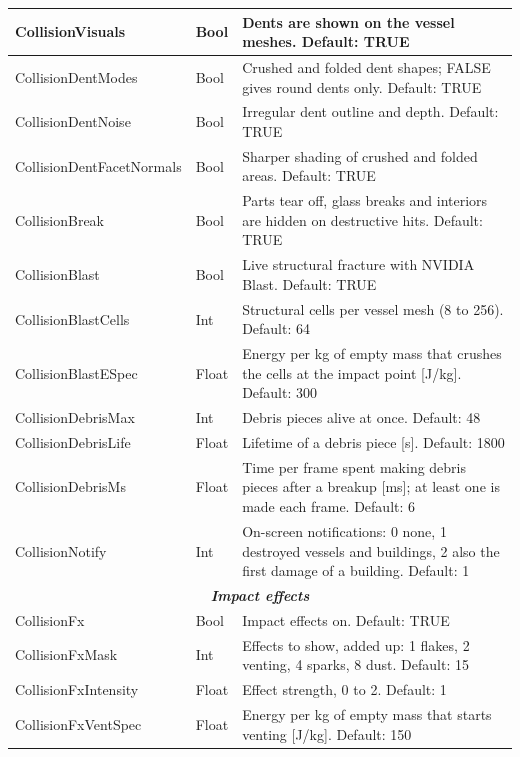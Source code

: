 \documentclass[Orbiter User Manual.tex]{subfiles}
\begin{document}
\begin{longtable}{ |p{}|p{}|p{}| }
	\hline\rule{0pt}{2ex}
	CollisionVisuals & Bool & Dents are shown on the vessel meshes. Default: TRUE\\
	\hline\rule{0pt}{2ex}
	CollisionDentModes & Bool & Crushed and folded dent shapes; FALSE gives round dents only. Default: TRUE\\
	\hline\rule{0pt}{2ex}
	CollisionDentNoise & Bool & Irregular dent outline and depth. Default: TRUE\\
	\hline\rule{0pt}{2ex}
	CollisionDentFacetNormals & Bool & Sharper shading of crushed and folded areas. Default: TRUE\\
	\hline\rule{0pt}{2ex}
	CollisionBreak & Bool & Parts tear off, glass breaks and interiors are hidden on destructive hits. Default: TRUE\\
	\hline\rule{0pt}{2ex}
	CollisionBlast & Bool & Live structural fracture with NVIDIA Blast. Default: TRUE\\
	\hline\rule{0pt}{2ex}
	CollisionBlastCells & Int & Structural cells per vessel mesh (8 to 256). Default: 64\\
	\hline\rule{0pt}{2ex}
	CollisionBlastESpec & Float & Energy per kg of empty mass that crushes the cells at the impact point [J/kg]. Default: 300\\
	\hline\rule{0pt}{2ex}
	CollisionDebrisMax & Int & Debris pieces alive at once. Default: 48\\
	\hline\rule{0pt}{2ex}
	CollisionDebrisLife & Float & Lifetime of a debris piece [s]. Default: 1800\\
	\hline\rule{0pt}{2ex}
	CollisionDebrisMs & Float & Time per frame spent making debris pieces after a breakup [ms]; at least one is made each frame. Default: 6\\
	\hline\rule{0pt}{2ex}
	CollisionNotify & Int & On-screen notifications: 0 none, 1 destroyed vessels and buildings, 2 also the first damage of a building. Default: 1\\
	\hline
	\multicolumn{3}{|c|}{\rule{0pt}{2ex}\textbf{\textit{Impact effects}}}\\
	\hline\rule{0pt}{2ex}
	CollisionFx & Bool & Impact effects on. Default: TRUE\\
	\hline\rule{0pt}{2ex}
	CollisionFxMask & Int & Effects to show, added up: 1 flakes, 2 venting, 4 sparks, 8 dust. Default: 15\\
	\hline\rule{0pt}{2ex}
	CollisionFxIntensity & Float & Effect strength, 0 to 2. Default: 1\\
	\hline\rule{0pt}{2ex}
	CollisionFxVentSpec & Float & Energy per kg of empty mass that starts venting [J/kg]. Default: 150\\

\end{longtable}
\end{document}
